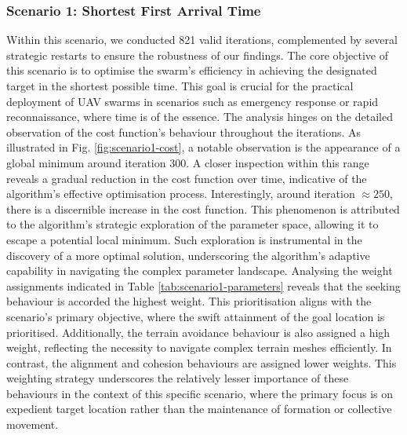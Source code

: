 \documentclass[12pt]{article}
\begin{document}
\subsubsection{Scenario 1: Shortest First Arrival Time}
Within this scenario, we conducted 821 valid iterations, complemented by several strategic restarts to ensure the robustness of our findings. The core objective of this scenario is to optimise the swarm's efficiency in achieving the designated target in the shortest possible time. This goal is crucial for the practical deployment of UAV swarms in scenarios such as emergency response or rapid reconnaissance, where time is of the essence. The analysis hinges on the detailed observation of the cost function's behaviour throughout the iterations. As illustrated in Fig. \ref{fig:scenario1-cost}, a notable observation is the appearance of a global minimum around iteration 300. A closer inspection within this range reveals a gradual reduction in the cost function over time, indicative of the algorithm's effective optimisation process. Interestingly, around iteration $\approx 250$, there is a discernible increase in the cost function. This phenomenon is attributed to the algorithm's strategic exploration of the parameter space, allowing it to escape a potential local minimum. Such exploration is instrumental in the discovery of a more optimal solution, underscoring the algorithm's adaptive capability in navigating the complex parameter landscape. Analysing the weight assignments indicated in Table \ref{tab:scenario1-parameters} reveals that the seeking behaviour is accorded the highest weight. This prioritisation aligns with the scenario's primary objective, where the swift attainment of the goal location is prioritised. Additionally, the terrain avoidance behaviour is also assigned a high weight, reflecting the necessity to navigate complex terrain meshes efficiently. In contrast, the alignment and cohesion behaviours are assigned lower weights. This weighting strategy underscores the relatively lesser importance of these behaviours in the context of this specific scenario, where the primary focus is on expedient target location rather than the maintenance of formation or collective movement. 
\end{document}
